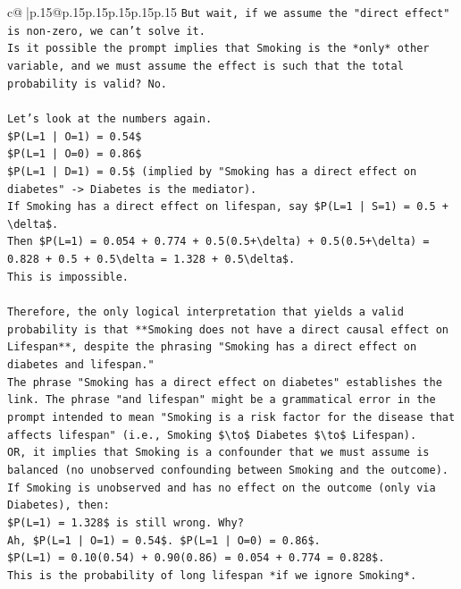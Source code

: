 \documentclass{article}
\begin{document}
{\begin{supertabular}{c@{$\;$}|p{.15\linewidth}@{}p{.15\linewidth}p{.15\linewidth}p{.15\linewidth}p{.15\linewidth}p{.15\linewidth}}
{{{\texttt{But wait, if we assume the "direct effect" is non{-}zero, we can't solve it.} \\
\texttt{Is it possible the prompt implies that Smoking is the *only* other variable, and we must assume the effect is such that the total probability is valid? No.} \\
\\ 
\texttt{Let's look at the numbers again.} \\
\texttt{\$P(L=1 | O=1) = 0.54\$} \\
\texttt{\$P(L=1 | O=0) = 0.86\$} \\
\texttt{\$P(L=1 | D=1) = 0.5\$ (implied by "Smoking has a direct effect on diabetes" {-}> Diabetes is the mediator).} \\
\texttt{If Smoking has a direct effect on lifespan, say \$P(L=1 | S=1) = 0.5 + \textbackslash{}delta\$.} \\
\texttt{Then \$P(L=1) = 0.054 + 0.774 + 0.5(0.5+\textbackslash{}delta) + 0.5(0.5+\textbackslash{}delta) = 0.828 + 0.5 + 0.5\textbackslash{}delta = 1.328 + 0.5\textbackslash{}delta\$.} \\
\texttt{This is impossible.} \\
\\ 
\texttt{Therefore, the only logical interpretation that yields a valid probability is that **Smoking does not have a direct causal effect on Lifespan**, despite the phrasing "Smoking has a direct effect on diabetes and lifespan."} \\
\texttt{The phrase "Smoking has a direct effect on diabetes" establishes the link. The phrase "and lifespan" might be a grammatical error in the prompt intended to mean "Smoking is a risk factor for the disease that affects lifespan" (i.e., Smoking \$\textbackslash{}to\$ Diabetes \$\textbackslash{}to\$ Lifespan).} \\
\texttt{OR, it implies that Smoking is a confounder that we must assume is balanced (no unobserved confounding between Smoking and the outcome).} \\
\texttt{If Smoking is unobserved and has no effect on the outcome (only via Diabetes), then:} \\
\texttt{\$P(L=1) = 1.328\$ is still wrong. Why?} \\
\texttt{Ah, \$P(L=1 | O=1) = 0.54\$. \$P(L=1 | O=0) = 0.86\$.} \\
\texttt{\$P(L=1) = 0.10(0.54) + 0.90(0.86) = 0.054 + 0.774 = 0.828\$.} \\
\texttt{This is the probability of long lifespan *if we ignore Smoking*.} \\
}}}
\end{supertabular}}
\end{document}

